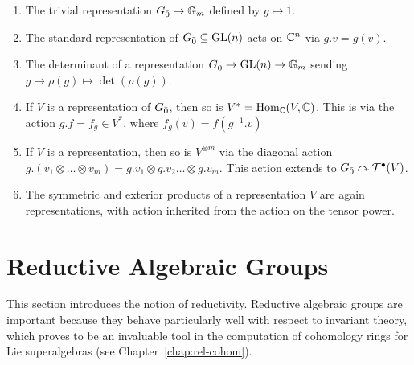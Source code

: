 \begin{example}
  \begin{enumerate}
  \item The trivial representation ${G}_{\bar{0}} \to \mathbb{G}_m$ defined by $g \mapsto 1$.
  \item The standard representation of ${G}_{\bar{0}} \subseteq \operatorname{GL}(n)$ acts on $\mathbb{C}^n$ via $g.v = g(v)$.
  \item The determinant of a representation ${G}_{\bar{0}} \to \operatorname{GL}(n) \to \mathbb{G}_m$ sending $g \mapsto \rho(g) \mapsto \det(\rho(g))$.
  \item If $V$ is a representation of ${G}_{\bar{0}}$, then so is $V^* = \operatorname{Hom}_{\mathbb{C}}(V,\mathbb{C})$. This is via the action $g.f = f_g \in V^*$, where $f_g(v) = f(g^{-1}.v)$
  \item If $V$ is a representation, then so is $V^{\otimes m}$ via the diagonal action $g.(v_1 \otimes \ldots \otimes v_m) = g.v_1 \otimes g.v_2 \ldots \otimes g.v_m$. This action extends to ${G}_{\bar{0}} \curvearrowright \mathcal{T}^\bullet(V)$.
  \item The symmetric and exterior products of a representation $V$ are again representations, with action inherited from the action on the tensor power.
  \end{enumerate}
\end{example}

\section{Reductive Algebraic Groups}
\label{sec:reductive}

This section introduces the notion of reductivity. Reductive algebraic groups are important because they behave particularly well with respect to invariant theory, which proves to be an invaluable tool in the computation of cohomology rings for Lie superalgebras (see Chapter~\ref{chap:rel-cohom}).

